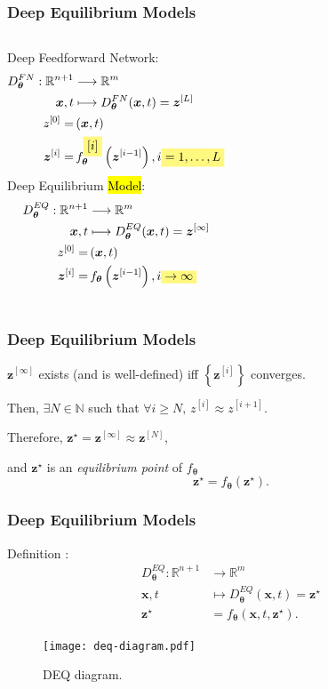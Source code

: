 \documentclass[t]{beamer}
\newcommand{\R}{\mathbb{R}}
\newcommand{\N}{\mathbb{N}}
\newcommand{\highlight}[1]{%
  \colorbox{yellow!50}{$\displaystyle#1$}}
\begin{document}
\begin{frame}
    \frametitle{Deep Equilibrium Models}
    \begin{columns}
	Deep Feedforward Network:
	\begin{align*}
	    D^{FN}_{\bm{\theta}}: \R^{n+1} &\longrightarrow \R^{m} \\
	    \bm{x}, t &\longmapsto D^{FN}_{\bm{\theta}}(\bm{x},t) = \bm{z}^{[L]} \\
	    z^{[0]} =&\, (\bm{x}, t) \\
	    \bm{z}^{[i]} =&\, f^{\highlight{[i]}}_{\bm{\theta}}\left( \bm{z}^{[i-1]} \right) , i\highlight{=1,\ldots,L}
	\end{align*} \pause
	Deep Equilibrium \hl{Model}:
	\begin{align*}
	    D^{EQ}_{\bm{\theta}}: \R^{n+1} &\longrightarrow \R^{m} \\
	    \bm{x}, t &\longmapsto D^{EQ}_{\bm{\theta}}(\bm{x},t) = \bm{z}^{[\infty]} \\
	    z^{[0]} =&\, (\bm{x}, t) \\
	    \bm{z}^{[i]} =&\, f_{\bm{\theta}}\left( \bm{z}^{[i-1]} \right) , i\highlight{\to \infty}
	\end{align*}
    \end{columns}
\end{frame}

\begin{frame}
    \frametitle{Deep Equilibrium Models}
    $\bm{z}^{[\infty]}$ exists (and is well-defined) iff $\left\{  \bm{z}^{[i]} \right\}$ converges.
    \linebreak

    Then, $\exists N\in \N$ such that $\forall i\ge N,\,z^{[i]}\approx z^{[i+1]}$.
    \linebreak

    Therefore, $\bm{z}^{\star}=\bm{z}^{[\infty]}\approx \bm{z}^{[N]}$,
    \linebreak

    and $\bm{z}^{\star}$ is an \emph{equilibrium point} of $f_{\bm{\theta}}$ \[
	    \bm{z}^{\star} = f_{\bm{\theta}}\left( \bm{z}^{\star} \right)
    .\] 
\end{frame}

\begin{frame}
    \frametitle{Deep Equilibrium Models}
    Definition \cite{Bai2019}:
    \begin{align*}
	D^{EQ}_{\bm{\theta}}: \R^{n+1} &\longrightarrow \R^{m} \\
	\bm{x},t &\longmapsto 	D^{EQ}_{\bm{\theta}}(\bm{x},t) = \bm{z}^{\star} \\
	\bm{z}^{\star} &= f_{\bm{\theta}}\left( \bm{x},t, \bm{z}^{\star} \right)
    .\end{align*}

    \pause
    \begin{figure}[h]
        \centering
        \texttt{[image: deq-diagram.pdf]}
        \caption{DEQ diagram.}
        \label{fig:deq-diagram-}
    \end{figure}
\end{frame}
\end{document}
